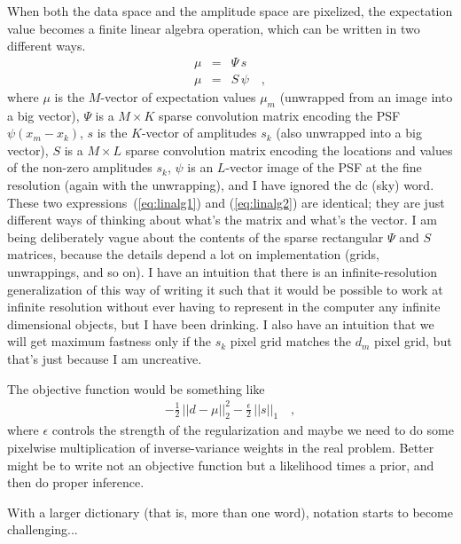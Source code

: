 \documentclass[12pt]{article}
\begin{document}
When both the data space and the amplitude space are pixelized, the
expectation value becomes a finite linear algebra operation, which can
be written in two different ways.
\begin{eqnarray}
\mu &=& \Psi\,s \label{eq:linalg1}
\\
\mu &=& S\,\psi \label{eq:linalg2}
\quad ,
\end{eqnarray}
where $\mu$ is the $M$-vector of expectation values $\mu_m$ (unwrapped
from an image into a big vector), $\Psi$ is a $M\times K$ sparse
convolution matrix encoding the PSF $\psi(x_m - x_k)$, $s$ is the
$K$-vector of amplitudes $s_k$ (also unwrapped into a big vector), $S$
is a $M\times L$ sparse convolution matrix encoding the locations and
values of the non-zero amplitudes $s_k$, $\psi$ is an $L$-vector image
of the PSF at the fine resolution (again with the unwrapping), and I
have ignored the dc (sky) word.
These two expressions~(\ref{eq:linalg1}) and (\ref{eq:linalg2}) are
identical; they are just different ways of thinking about what's the
matrix and what's the vector.
I am being deliberately vague about the contents of the sparse
rectangular $\Psi$ and $S$ matrices, because the details depend a lot
on implementation (grids, unwrappings, and so on).
I have an intuition that there is an infinite-resolution
generalization of this way of writing it such that it would be
possible to work at infinite resolution without ever having to
represent in the computer any infinite dimensional objects, but I have
been drinking.
I also have an intuition that we will get maximum fastness only if the
$s_k$ pixel grid matches the $d_m$ pixel grid, but that's just because
I am uncreative.

The objective function would be something like
\begin{eqnarray}
-\frac{1}{2}\,||d - \mu||_2^2 - \frac{\epsilon}{2}\,||s||_1
\quad ,
\end{eqnarray}
where $\epsilon$ controls the strength of the regularization and maybe
we need to do some pixelwise multiplication of inverse-variance
weights in the real problem.
Better might be to write not an objective function but a likelihood
times a prior, and then do proper inference.

With a larger dictionary (that is, more than one word), notation
starts to become challenging...
\end{document}
